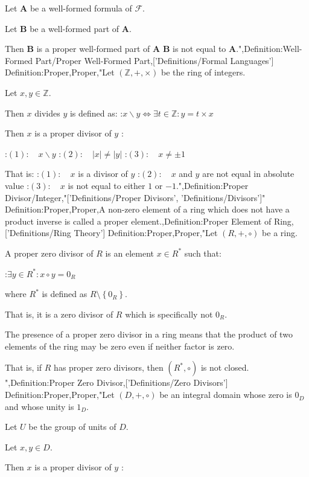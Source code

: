 Let $\mathbf A$ be a well-formed formula of $\mathcal F$.

Let $\mathbf B$ be a well-formed part of $\mathbf A$.


Then $\mathbf B$ is a proper well-formed part of $\mathbf A$  $\mathbf B$ is not equal to $\mathbf A$.",Definition:Well-Formed Part/Proper Well-Formed Part,['Definitions/Formal Languages']
Definition:Proper,Proper,"Let $\left( \mathbb Z, +, \times \right)$ be the ring of integers.

Let $x, y \in \mathbb Z$.


Then $x$ divides $y$ is defined as:
:$x \mathrel \backslash y \iff \exists t \in \mathbb Z: y = t \times x$


Then $x$ is a proper divisor of $y$ :

:$(1): \quad x \mathrel \backslash y$
:$(2): \quad \left\lvert x \right\rvert \ne \left\lvert y \right\rvert$
:$(3): \quad x \ne \pm 1$

That is:
:$(1): \quad x$ is a divisor of $y$
:$(2): \quad x$ and $y$ are not equal in absolute value
:$(3): \quad x$ is not equal to either $1$ or $-1$.",Definition:Proper Divisor/Integer,"['Definitions/Proper Divisors', 'Definitions/Divisors']"
Definition:Proper,Proper,A non-zero element of a ring which does not have a product inverse is called a proper element.,Definition:Proper Element of Ring,['Definitions/Ring Theory']
Definition:Proper,Proper,"Let $\left( R, +, \circ \right)$ be a ring.


A proper zero divisor of $R$ is an element $x \in R^*$ such that:

:$\exists y \in R^*: x \circ y = 0_R$

where $R^*$ is defined as $R \setminus \left\lbrace 0_R \right\rbrace$.


That is, it is a zero divisor of $R$ which is specifically not $0_R$.


The presence of a proper zero divisor in a ring means that the product of two elements of the ring may be zero even if neither factor is zero.

That is, if $R$ has proper zero divisors, then $\left( R^*, \circ \right)$ is not closed.
",Definition:Proper Zero Divisor,['Definitions/Zero Divisors']
Definition:Proper,Proper,"Let $\left( D, +, \circ \right)$ be an integral domain whose zero is $0_D$ and whose unity is $1_D$.

Let $U$ be the group of units of $D$.

Let $x, y \in D$.


Then $x$ is a proper divisor of $y$ :

